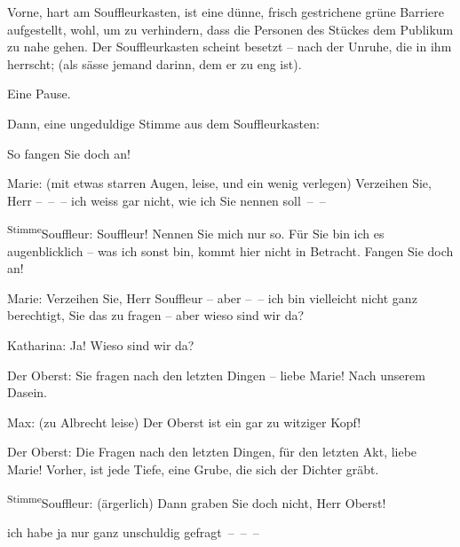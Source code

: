 \pstart
           Vorne, hart am Souffleurkasten, ist eine dünne, frisch gestrichene grüne Barriere
               aufgestellt, wohl, um zu verhindern, dass die Person\introOben{}en\introOben{} des
               Stückes dem Publikum zu nahe gehen. Der Souffleurkasten scheint besetzt – nach der
               Unruhe, die in ihm herrscht; (als sässe jemand darinn, dem er zu eng
               ist).\pend
           
\pstart
           Eine Pause.\pend
           
\pstart
           Dann, eine ungeduldige Stimme aus dem Souffleurkasten:\pend
           
\pstart
           {\pb}So fangen Sie doch an!\pend
           
\pstart
           Marie: (mit etwas starren Augen, leise, und ein wenig verlegen) Verzeihen Sie, Herr
               – – – ich weiss gar nicht, wie ich Sie nennen soll – –\pend
           
\pstart
           \substVorne{}\textsuperscript{Stimme}\substDazwischen{}Souffleur\substHinten{}: Souffleur! Nennen Sie mich nur so. Für Sie bin ich es augenblicklich – was
               ich sonst bin, kommt hier nicht in Betracht. Fangen Sie doch an!\pend
           
\pstart
           Marie: Verzeihen Sie, Herr Souffleur – aber – – ich bin vielleicht nicht ganz
               berechtigt, Sie das zu fragen – aber wieso sind wir da?\pend
           
\pstart
           Katharina: Ja! Wieso sind wir da?\pend
           
\pstart
           Der Oberst: Sie fragen nach den letzten Dingen – liebe Marie! Nach unserem
               Dasein.\pend
           
\pstart
           Max: (zu Albrecht leise) Der Oberst ist ein gar zu witziger Kopf!\pend
           
\pstart
           Der Oberst: Die  Fragen nach den letzten Dingen,
               für den letzten Akt, liebe Marie! Vorher, ist jede Tiefe, eine Grube, die sich der
               Dichter gräbt.\pend
           
\pstart
           \substVorne{}\textsuperscript{Stimme}\substDazwischen{}Souffleur\substHinten{}: (ärgerlich) Dann graben Sie doch nicht, Herr Oberst!\pend
           
\pstart
           \label{T_L01900-1v}\label{T_L01900-1} ich habe ja
               nur ganz unschuldig gefragt – – –\pend
           

